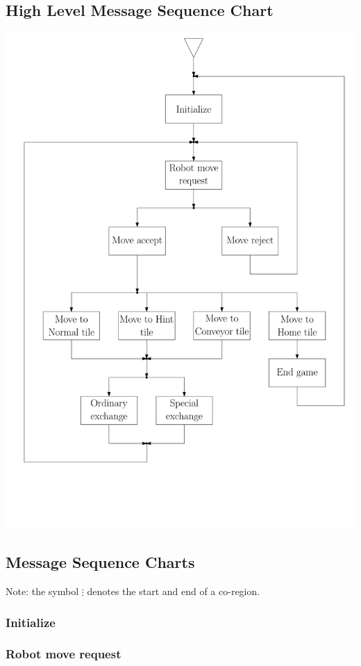\subsection{High Level Message Sequence Chart}
	\includegraphics[width=\linewidth,bb=0 0 680 1000]{MSC-files/HMSC.pdf}
	
\subsection{Message Sequence Charts}
	Note: the symbol $\vdots$ denotes the start and end of a co-region.

	\subsubsection{Initialize}
    	
    	
	\subsubsection{Robot move request}
	
	
